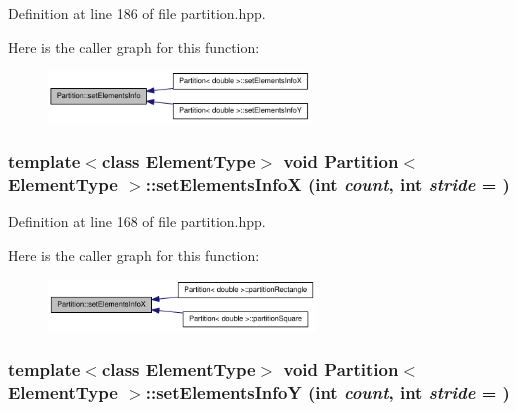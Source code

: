 Definition at line 186 of file partition.hpp.

Here is the caller graph for this function:\nopagebreak
\begin{figure}[H]
\begin{center}
\leavevmode
\includegraphics[width=197pt]{class_partition_aa5dc8e134f02dadb839fa5cf50506ec0_icgraph}
\end{center}
\end{figure}
\hypertarget{class_partition_a645aef56ca3bc0e0d059e9efb0301f97}{
\subsubsection[{setElementsInfoX}]{\setlength{\rightskip}{0pt plus 5cm}template$<$class ElementType$>$ void {\bf Partition}$<$ ElementType $>$::setElementsInfoX (int {\em count}, \/  int {\em stride} = {})}}
\label{class_partition_a645aef56ca3bc0e0d059e9efb0301f97}


Definition at line 168 of file partition.hpp.

Here is the caller graph for this function:\nopagebreak
\begin{figure}[H]
\begin{center}
\leavevmode
\includegraphics[width=201pt]{class_partition_a645aef56ca3bc0e0d059e9efb0301f97_icgraph}
\end{center}
\end{figure}
\hypertarget{class_partition_a67f73cecff570475924b28cad0a77e6c}{
\subsubsection[{setElementsInfoY}]{\setlength{\rightskip}{0pt plus 5cm}template$<$class ElementType$>$ void {\bf Partition}$<$ ElementType $>$::setElementsInfoY (int {\em count}, \/  int {\em stride} = {})}}
\label{class_partition_a67f73cecff570475924b28cad0a77e6c}


